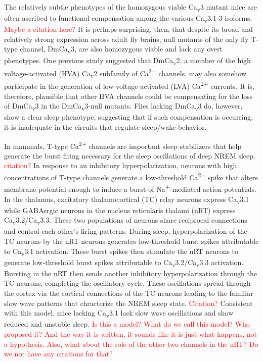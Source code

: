 The relatively subtle phenotypes of the homozygous viable Ca\textsubscript{v}3 mutant mice are often ascribed to functional compensation among the various Ca\textsubscript{v}3.1-3 isoforms. \textcolor{red}{Maybe a citation here?}
It is perhaps surprising, then, that despite its broad and relatively strong expression across adult fly brains, null mutants of the only fly T-type channel, DmCa\textsubscript{v}3, are also homozygous viable and lack any overt phenotypes.
One previous study suggested that DmCa\textsubscript{v}2, a member of the high voltage-activated (HVA) Ca\textsubscript{v}2 subfamily of Ca\textsuperscript{2+} channels, may also somehow participate in the generation of low voltage-activated (LVA) Ca\textsuperscript{2+} currents\cite{Ryglewski:2012jk}.
It is, therefore, plausible that other HVA channels could be compensating for the loss of DmCa\textsubscript{v}3 in the DmCa\textsubscript{v}3-null mutants. Flies lacking DmCa\textsubscript{v}3 do, however, show a clear sleep phenotype, suggesting that if such compensation is occurring, it is inadequate in the circuits that regulate sleep/wake behavior.

In mammals, T-type Ca\textsuperscript{2+} channels are important sleep stabilizers that help generate the burst firing necessary for the sleep oscillations of deep NREM sleep. \textcolor{red}{citation?}
In response to an inhibitory hyperpolarization, neurons with high concentrations of T-type channels generate a low-threshold Ca\textsuperscript{2+} spike that alters membrane potential enough to induce a burst of Na\textsuperscript{+}-mediated action potentials.
In the thalamus, excitatory thalamocortical (TC) relay neurons express Ca\textsubscript{v}3.1 while GABAergic neurons in the nucleus reticularis thalami (nRT) express Ca\textsubscript{v}3.2/Ca\textsubscript{v}3.3.
These two populations of neurons share reciprocal connections and control each other's firing patterns.
During sleep, hyperpolarization of the TC neurons by the nRT neurons generates low-threshold burst spikes attributable to Ca\textsubscript{v}3.1 activation.
These burst spikes then stimulate the nRT neurons to generate low-threshold burst spikes attributable to Ca\textsubscript{v}3.2/Ca\textsubscript{v}3.3 activation.
Bursting in the nRT then sends another inhibitory hyperpolarization through the TC neurons, completing the oscillatory cycle.
These oscillations spread through the cortex via the cortical connections of the TC neurons leading to the familiar slow wave patterns that chracterize the NREM sleep state. \textcolor{red}{Citation?}
Consistent with this model, mice lacking Ca\textsubscript{v}3.1 lack slow wave oscillations and show reduced and unstable sleep\cite{Lee:2004ey}.
\textcolor{red}{Is this a model? What do we call this model? Who proposed it? And the way it is written, it sounds like it is just what happens, not a hypothesis.}
\textcolor{red}{Also, what about the role of the other two channels in the nRT? Do we not have any citations for that?}

